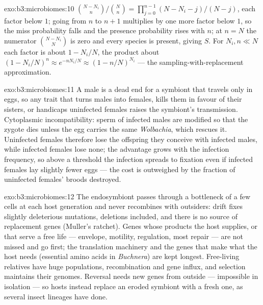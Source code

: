 \begin{solution}{exo:b3:microbiomes:10}
$\binom{N-N_{i}}{n}/\binom{N}{n} = \prod_{j=0}^{n-1}(N - N_{i} - j)/(N -
j)$, each factor below $1$; going from $n$ to $n + 1$ multiplies by one
more factor below $1$, so the miss probability falls and the presence
probability rises with $n$; at $n = N$ the numerator $\binom{N -
N_{i}}{N}$ is zero and every species is present, giving $S$. For $N_{i},
n \ll N$ each factor is about $1 - N_{i}/N$, the product about $(1 -
N_{i}/N)^{n} \approx e^{-nN_{i}/N} \approx (1 - n/N)^{N_{i}}$ --- the
sampling-with-replacement approximation.
\end{solution}

\begin{solution}{exo:b3:microbiomes:11}
A male is a dead end for a symbiont that travels only in eggs, so any
trait that turns males into females, kills them in favour of their
sisters, or handicaps uninfected females raises the symbiont's
transmission. Cytoplasmic incompatibility: sperm of infected males are
modified so that the zygote dies unless the egg carries the same
\emph{Wolbachia}, which rescues it. Uninfected females therefore lose
the offspring they conceive with infected males, while infected females
lose none; the advantage grows with the infection frequency, so above a
threshold the infection spreads to fixation even if infected females
lay slightly fewer eggs --- the cost is outweighed by the fraction of
uninfected females' broods destroyed.
\end{solution}

\begin{solution}{exo:b3:microbiomes:12}
The endosymbiont passes through a bottleneck of a few cells at each
host generation and never recombines with outsiders: drift fixes
slightly deleterious mutations, deletions included, and there is no
source of replacement genes (Muller's ratchet). Genes whose products
the host supplies, or that serve a free life --- envelope, motility,
regulation, most repair --- are not missed and go first; the
translation machinery and the genes that make what the host needs
(essential amino acids in \emph{Buchnera}) are kept longest. Free-living
relatives have huge populations, recombination and gene influx, and
selection maintains their genomes. Reversal needs new genes from
outside --- impossible in isolation --- so hosts instead replace an
eroded symbiont with a fresh one, as several insect lineages have done.
\end{solution}

